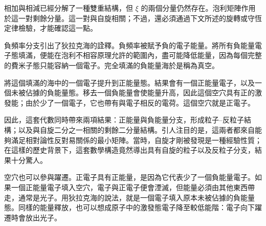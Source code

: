 相加與相減已經分解了一種雙重結構，但 \(\xi\) 的兩個分量仍然存在。泡利矩陣作用於這一對剩餘分量。這一對與自旋相關；不過，還必須通過下文所述的旋轉或守恆定律檢驗，才能確認這一點。

\begin{classroomqa}
\end{classroomqa}

負頻率分支引出了狄拉克海的詮釋。負頻率被賦予負的電子能量。將所有負能量電子態填滿，便能在泡利不相容原理允許的範圍內，盡可能降低能量，因為每個完整的費米子態只能容納一個電子。完全填滿的負能量海於是稱為真空。

將這個填滿的海中的一個電子提升到正能量態。結果會有一個正能量電子，以及一個未被佔據的負能量態。移去一個負能量會使能量升高，因此這個空穴具有正的激發能；由於少了一個電子，它也帶有與電子相反的電荷。這個空穴就是正電子。

\begin{classroomqa}
\end{classroomqa}

因此，這套代數同時帶來兩項結果：正能量與負能量分支，形成粒子--反粒子結構；以及與自旋二分之一相關的剩餘二分量結構。引人注目的是，這兩者都來自能夠滿足相對論性反對易關係的最小矩陣。當時，自旋才剛被發現是一種經驗性質；在這樣的歷史背景下，這套數學構造竟然導出具有自旋的粒子以及反粒子分支，結果十分驚人。

\begin{classroomqa}
\end{classroomqa}

空穴也可以參與躍遷。正電子具有正能量，是因為它代表少了一個負能量電子。如果一個正能量電子填入空穴，電子與正電子便會湮滅，但能量必須由其他東西帶走，通常是光子。用狄拉克海的說法，就是一個電子填入原本未被佔據的負能量態。同樣的能量釋放，也可以想成原子中的激發態電子降至較低能階：電子向下躍遷時會放出光子。

